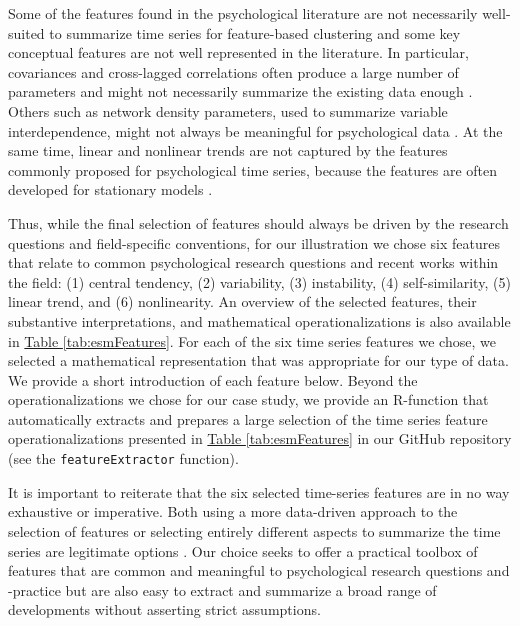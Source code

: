 \documentclass[man, 12pt, a4paper, mask, floatsintext]{apa7}
\theoremstyle{break}
\theoremstyle{plain}
\newcommand{\tblref}[2][]{\hyperref[#2]{Table \ref*{#2}#1}}
\begin{document}
Some of the features found in the psychological literature are not necessarily well-suited to summarize time series for feature-based clustering and some key conceptual features are not well represented in the literature. In particular, covariances and cross-lagged correlations often produce a large number of parameters and might not necessarily summarize the existing data enough \citep{ernst2021}. Others such as network density parameters, used to summarize variable interdependence, might not always be meaningful for psychological data \citep{bringmann2019a}. At the same time, linear and nonlinear trends are not captured by the features commonly proposed for psychological time series, because the features are often developed for stationary models \citep[e.g.,][]{krone2018}. 

Thus, while the final selection of features should always be driven by the research questions and field-specific conventions, for our illustration we chose six features that relate to common psychological research questions and recent works within the field: (1) central tendency, (2) variability, (3) instability, (4) self-similarity, (5) linear trend, and (6) nonlinearity. An overview of the selected features, their substantive interpretations, and mathematical operationalizations is also available in \tblref{tab:esmFeatures}. For each of the six time series features we chose, we selected a mathematical representation that was appropriate for our type of data. We provide a short introduction of each feature below. Beyond the operationalizations we chose for our case study, we provide an R-function that automatically extracts and prepares a large selection of the time series feature operationalizations presented in \tblref{tab:esmFeatures} in our GitHub repository (see the \texttt{featureExtractor} function).





It is important to reiterate that the six selected time-series features are in no way exhaustive or imperative. Both using a more data-driven approach to the selection of features or selecting entirely different aspects to summarize the time series are legitimate options \citep[e.g., see][]{heylen2016}. Our choice seeks to offer a practical toolbox of features that are common and meaningful to psychological research questions and -practice but are also easy to extract and summarize a broad range of developments without asserting strict assumptions.
\end{document}
